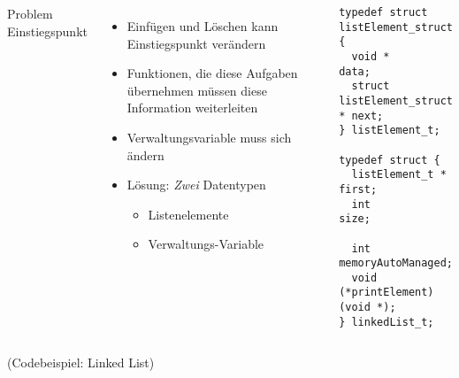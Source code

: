 
\begin{frame}[fragile]
%
\begin{columns}[T]
\begin{Large}
{Problem Einstiegspunkt}
\vspace{6pt}
\end{Large}
%
\begin{itemize}
\item Einfügen und Löschen kann Einstiegspunkt verändern
\item Funktionen, die diese Aufgaben übernehmen müssen diese Information weiterleiten
\item Verwaltungsvariable muss sich ändern
\item Lösung: \emph{Zwei} Datentypen
	\begin{itemize}
	\item Listenelemente
	\item Verwaltungs-Variable
	\end{itemize}
\end{itemize}
%
\begin{codebox}
\begin{verbatim}
typedef struct listElement_struct {
  void *                      data;
  struct listElement_struct * next;
} listElement_t;

typedef struct {
  listElement_t * first;
  int             size;
  
  int             memoryAutoManaged;
  void (*printElement)(void *);
} linkedList_t;
\end{verbatim}
\end{codebox}
\end{columns}
%
\end{frame}


\begin{frame}
%
\begin{center}
(Codebeispiel: Linked List)
\end{center}
%
\end{frame}


